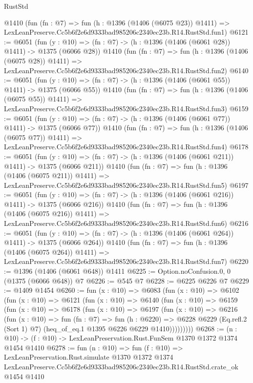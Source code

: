 \begin{lexlean}{RustStd}
\begin{coremodule}
    @1410
    (fun (fn : @7) =>
    fun (h : @1396 (@1406 (@6075 @23)) @1411) =>
    LexLeanPreserve.Cc5b6f2e6d9333bad985206c2340ec23b.R14.RustStd.fun1)
@6121 := @6051
    (fun (y : @10) => (fn : @7) -> (h : @1396 (@1406 (@6061 @28)) @1411) -> @1375 (@6066 @28))
    @1410
    (fun (fn : @7) =>
    fun (h : @1396 (@1406 (@6075 @28)) @1411) =>
    LexLeanPreserve.Cc5b6f2e6d9333bad985206c2340ec23b.R14.RustStd.fun2)
@6140 := @6051
    (fun (y : @10) => (fn : @7) -> (h : @1396 (@1406 (@6061 @55)) @1411) -> @1375 (@6066 @55))
    @1410
    (fun (fn : @7) =>
    fun (h : @1396 (@1406 (@6075 @55)) @1411) =>
    LexLeanPreserve.Cc5b6f2e6d9333bad985206c2340ec23b.R14.RustStd.fun3)
@6159 := @6051
    (fun (y : @10) => (fn : @7) -> (h : @1396 (@1406 (@6061 @77)) @1411) -> @1375 (@6066 @77))
    @1410
    (fun (fn : @7) =>
    fun (h : @1396 (@1406 (@6075 @77)) @1411) =>
    LexLeanPreserve.Cc5b6f2e6d9333bad985206c2340ec23b.R14.RustStd.fun4)
@6178 := @6051
    (fun (y : @10) => (fn : @7) -> (h : @1396 (@1406 (@6061 @211)) @1411) -> @1375 (@6066 @211))
    @1410
    (fun (fn : @7) =>
    fun (h : @1396 (@1406 (@6075 @211)) @1411) =>
    LexLeanPreserve.Cc5b6f2e6d9333bad985206c2340ec23b.R14.RustStd.fun5)
@6197 := @6051
    (fun (y : @10) => (fn : @7) -> (h : @1396 (@1406 (@6061 @216)) @1411) -> @1375 (@6066 @216))
    @1410
    (fun (fn : @7) =>
    fun (h : @1396 (@1406 (@6075 @216)) @1411) =>
    LexLeanPreserve.Cc5b6f2e6d9333bad985206c2340ec23b.R14.RustStd.fun6)
@6216 := @6051
    (fun (y : @10) => (fn : @7) -> (h : @1396 (@1406 (@6061 @264)) @1411) -> @1375 (@6066 @264))
    @1410
    (fun (fn : @7) =>
    fun (h : @1396 (@1406 (@6075 @264)) @1411) =>
    LexLeanPreserve.Cc5b6f2e6d9333bad985206c2340ec23b.R14.RustStd.fun7)
@6220 := @1396 (@1406 (@6061 @648)) @1411
@6225 := Option.noConfusion.{0, 0} (@1375 (@6066 @648)) @7
@6226 := @545 @7
@6228 := @6225 @6226 @7
@6229 := @1409 @1454
@6260 := fun (x : @10) =>
  @6083
    (fun (x : @10) =>
    @6102
      (fun (x : @10) =>
      @6121
        (fun (x : @10) =>
        @6140
          (fun (x : @10) =>
          @6159
            (fun (x : @10) =>
            @6178
              (fun (x : @10) =>
              @6197
                (fun (x : @10) =>
                @6216
                  (fun (x : @10) =>
                  fun (fn : @7) =>
                  fun (h : @6220) =>
                  @6228
                    @6229
                    (Eq.refl.{2} (Sort 1) @7)
                    (heq_of_eq.{1} @1395 @6226 @6229 @1410)))))))))
@6268 := (n : @10) -> (f : @10) -> LexLeanPreservation.Rust.FunSem @1370 @1372 @1374 @1454 @1410
@6278 := fun (n : @10) =>
  fun (f : @10) =>
  LexLeanPreservation.Rust.simulate
    @1370
    @1372
    @1374
    LexLeanPreserve.Cc5b6f2e6d9333bad985206c2340ec23b.R14.RustStd.crate_ok
    @1454
    @1410
\end{coremodule}
\end{lexlean}
